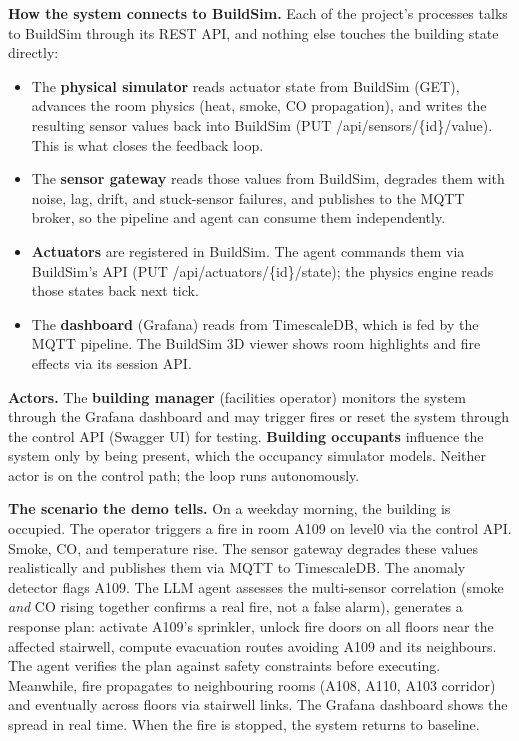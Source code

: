 \documentclass[11pt]{article}
\providecommand{\tightlist}{\setlength{\itemsep}{0pt}\setlength{\parskip}{0pt}}
\begin{document}
\textbf{How the system connects to BuildSim.} Each of the project's processes talks to BuildSim through its REST API, and nothing else touches the building state directly:
\begin{itemize}\tightlist
  \item The \textbf{physical simulator} reads actuator state from BuildSim (GET), advances the room physics (heat, smoke, CO propagation), and writes the resulting sensor values back into BuildSim (PUT /api/sensors/\{id\}/value). This is what closes the feedback loop.
  \item The \textbf{sensor gateway} reads those values from BuildSim, degrades them with noise, lag, drift, and stuck-sensor failures, and publishes to the MQTT broker, so the pipeline and agent can consume them independently.
  \item \textbf{Actuators} are registered in BuildSim. The agent commands them via BuildSim's API (PUT /api/actuators/\{id\}/state); the physics engine reads those states back next tick.
  \item The \textbf{dashboard} (Grafana) reads from TimescaleDB, which is fed by the MQTT pipeline. The BuildSim 3D viewer shows room highlights and fire effects via its session API.
\end{itemize}

\textbf{Actors.} The \textbf{building manager} (facilities operator) monitors the system through the Grafana dashboard and may trigger fires or reset the system through the control API (Swagger UI) for testing. \textbf{Building occupants} influence the system only by being present, which the occupancy simulator models. Neither actor is on the control path; the loop runs autonomously.

\textbf{The scenario the demo tells.} On a weekday morning, the building is occupied. The operator triggers a fire in room A109 on level0 via the control API. Smoke, CO, and temperature rise. The sensor gateway degrades these values realistically and publishes them via MQTT to TimescaleDB. The anomaly detector flags A109. The LLM agent assesses the multi-sensor correlation (smoke \emph{and} CO rising together confirms a real fire, not a false alarm), generates a response plan: activate A109's sprinkler, unlock fire doors on all floors near the affected stairwell, compute evacuation routes avoiding A109 and its neighbours. The agent verifies the plan against safety constraints before executing. Meanwhile, fire propagates to neighbouring rooms (A108, A110, A103 corridor) and eventually across floors via stairwell links. The Grafana dashboard shows the spread in real time. When the fire is stopped, the system returns to baseline.
\end{document}
